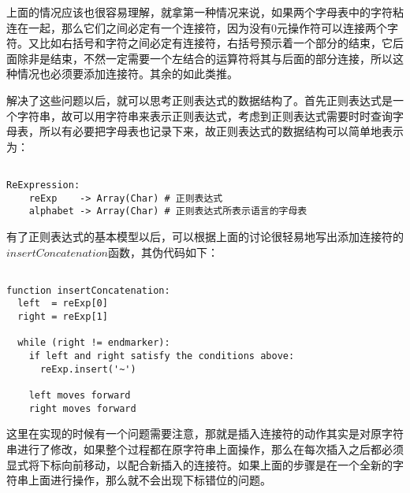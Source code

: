 上面的情况应该也很容易理解，就拿第一种情况来说，如果两个字母表中的字符粘连在一起，那么它们之间必定有一个连接符，因为没有0元操作符可以连接两个字符。又比如右括号和字符之间必定有连接符，右括号预示着一个部分的结束，它后面除非是结束，不然一定需要一个左结合的运算符将其与后面的部分连接，所以这种情况也必须要添加连接符。其余的如此类推。   

解决了这些问题以后，就可以思考正则表达式的数据结构了。首先正则表达式是一个字符串，故可以用字符串来表示正则表达式，考虑到正则表达式需要时时查询字母表，所以有必要把字母表也记录下来，故正则表达式的数据结构可以简单地表示为：

\begin{verbatim}

ReExpression:
    reExp    -> Array(Char) # 正则表达式
    alphabet -> Array(Char) # 正则表达式所表示语言的字母表

\end{verbatim}

有了正则表达式的基本模型以后，可以根据上面的讨论很轻易地写出添加连接符的$insertConcatenation$函数，其伪代码如下：

\begin{verbatim}

function insertConcatenation:
  left  = reExp[0]
  right = reExp[1]

  while (right != endmarker):
    if left and right satisfy the conditions above:
      reExp.insert('~')

    left moves forward
    right moves forward

\end{verbatim}

这里在实现的时候有一个问题需要注意，那就是插入连接符的动作其实是对原字符串进行了修改，如果整个过程都在原字符串上面操作，那么在每次插入之后都必须显式将下标向前移动，以配合新插入的连接符。如果上面的步骤是在一个全新的字符串上面进行操作，那么就不会出现下标错位的问题。
